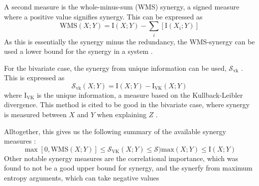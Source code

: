 \documentclass[../main.tex]{subfiles}
\begin{document}
A second measure is the whole-minus-sum (WMS) synergy, a signed measure where a positive value
signifies synergy.
This can be expressed as
%
\begin{equation}
\mathrm{WMS}(X;Y) = \mathrm{I}(X;Y) - \sum_i [\mathrm{I}(X_i;Y)]
\end{equation}
%
As this is essentially the synergy minus the redundancy, the WMS-synergy can be used a lower bound for the synergy in a system \cite{griffith2014quantifying, olbrich2015information}.

For the bivariate case, the synergy from unique information can be used, $\mathcal{S}_\mathrm{vk}$ \cite{bertschinger2014quantifying, griffith2014quantifying, olbrich2015information}.
This is expressed as
\begin{equation}
\mathcal{S}_\mathrm{vk} (X;Y) = \mathrm{I}(X;Y) - \mathrm{I}_\mathrm{VK} (X;Y)
\end{equation}
%
where $\mathrm{I}_\mathrm{VK}$ is the unique information, a measure based on the Kullback-Leibler divergence.
This method is cited to be good in the bivariate case, where synergy is measured between $X$ and $Y$ when explaining $Z$ \cite{olbrich2015information}.

Alltogether, this gives us the following summary of the available synergy measures \cite{griffith2014quantifying}:
%
\begin{equation}
\max [0,\mathrm{WMS}(X;Y)] \le \mathcal{S}_\mathrm{VK} (X;Y) \le \mathcal{S})\mathrm{max} (X;Y) \le \mathrm{I}(X;Y)
\end{equation}
%
Other notable synergy measures are the correlational importance, which was found to not be a good upper bound for synergy, and the synerfy from maximum entropy arguments, which can take negative values \cite{griffith2014quantifying, olbrich2015information}
\end{document}
